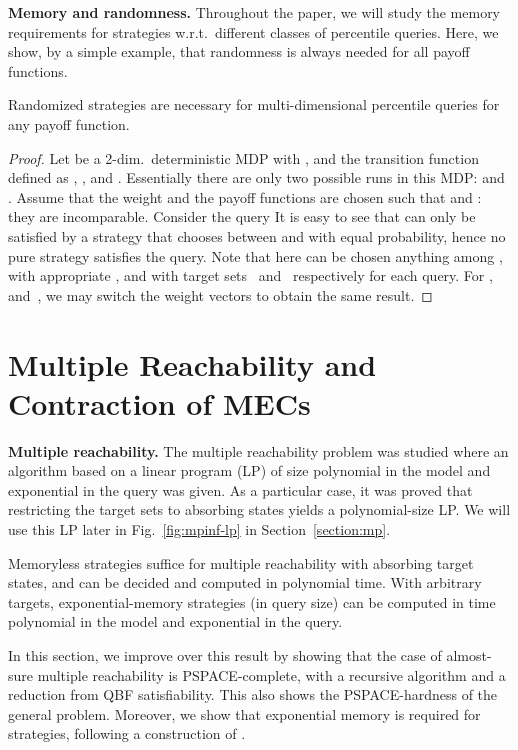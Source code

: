 \documentclass{llncs}
\newcommand\PSPACE{\textrm{\sf PSPACE}}
\begin{document}
\smallskip\noindent\textbf{Memory and randomness.} 
Throughout the paper, we will study the memory requirements for strategies w.r.t.~different classes of percentile queries.
Here, we show, by a simple example, that randomness is always needed for all payoff functions.

\begin{lemma}
Randomized strategies are necessary for multi-dimensional percentile queries for any payoff function.
\end{lemma}

\begin{proof}
Let  be a 2-dim.~deterministic MDP with ,  and the transition function defined as , ,  and . Essentially there are only two possible runs in this MDP:  and . Assume that the weight and the payoff functions are chosen such that  and : they are incomparable. Consider the query  It is easy to see that  can only be satisfied by a strategy that chooses between  and  with equal probability, hence no pure strategy satisfies the query. 
Note that here  can be chosen anything among ,  with appropriate ,
and  with target sets~ and~ respectively for each query. For , and~, we may switch the weight vectors to obtain the same result.
\end{proof}

\section{Multiple Reachability and Contraction of MECs}
\label{section:reachsafe}

\smallskip\noindent\textbf{Multiple reachability.} The multiple reachability  problem
was studied \cite{EKVY-lmcs08} where an algorithm based on a linear program (LP) of size polynomial in the model and exponential in the query was given.
As a particular case, it was proved that restricting the target sets to absorbing states yields a polynomial-size LP. We will use this LP later in Fig.~\ref{fig:mpinf-lp} in Section~\ref{section:mp}.


\begin{theorem}
  \label{thm:absorbing-reachsafe}
  Memoryless strategies suffice for multiple reachability with absorbing target states, and
  can be decided and computed in polynomial time.
  With arbitrary targets, exponential-memory strategies (in query size) can be computed in time polynomial in the model and exponential in the query.
\end{theorem}


In this section, we improve over this result by showing that the case of almost-sure multiple reachability is \PSPACE-complete,
with a recursive algorithm and a reduction from QBF satisfiability.
This also shows the \PSPACE-hardness of the general problem. Moreover, we show that exponential memory is required for strategies,
following a construction of \cite{DBLP:journals/acta/ChatterjeeRR14}.
\end{document}
